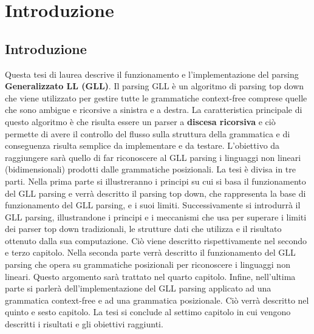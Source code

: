 \chapter{Introduzione}
\section{Introduzione}
Questa tesi di laurea descrive il funzionamento e l'implementazione del parsing \textbf{Generalizzato LL (GLL)}. Il parsing GLL è un algoritmo di parsing top down che viene utilizzato per gestire tutte le grammatiche context-free comprese quelle che sono ambigue e ricorsive a sinistra e a destra. La caratteristica principale di questo algoritmo è che risulta essere un parser a \textbf{discesa ricorsiva} e ciò permette di avere il controllo del flusso sulla struttura della grammatica e di conseguenza risulta semplice da implementare e da testare. L'obiettivo da raggiungere sarà quello di far riconoscere al GLL parsing i linguaggi non lineari (bidimensionali) prodotti dalle grammatiche posizionali. La tesi è divisa in tre parti. Nella prima parte si illustreranno i principi su cui si basa il funzionamento del GLL parsing e verrà descritto il parsing top down, che rappresenta la base di funzionamento del GLL parsing, e i suoi limiti. Successivamente si introdurrà il GLL parsing, illustrandone i principi e i meccanismi che usa per superare i limiti dei parser top down tradizionali, le strutture dati che utilizza e il risultato ottenuto dalla sua computazione. Ciò viene descritto rispettivamente nel secondo e terzo capitolo. Nella seconda parte verrà descritto il funzionamento del GLL parsing che opera su grammatiche posizionali per riconoscere i linguaggi non lineari. Questo argomento sarà trattato nel quarto capitolo. Infine, nell'ultima parte si parlerà dell'implementazione del GLL parsing applicato ad una grammatica context-free e ad una grammatica posizionale. Ciò verrà descritto nel quinto e sesto capitolo. La tesi si conclude al settimo capitolo in cui vengono descritti i risultati e gli obiettivi raggiunti.